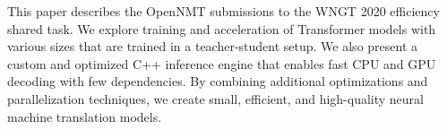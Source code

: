 This paper describes the OpenNMT submissions to the WNGT 2020 efficiency shared task. We explore training and acceleration of Transformer models with various sizes that are trained in a teacher-student setup. We also present a custom and optimized C++ inference engine that enables fast CPU and GPU decoding with few dependencies. By combining additional optimizations and parallelization techniques, we create small, efficient, and high-quality neural machine translation models.
